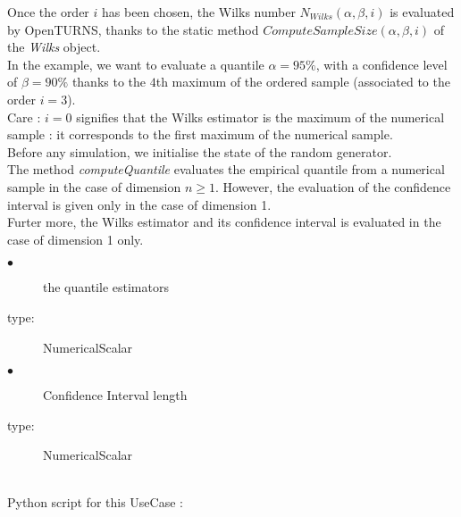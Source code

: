 Once the order $i$ has been chosen, the Wilks number $N_{Wilks}(\alpha, \beta,i)$ is evaluated by OpenTURNS, thanks to the static method $ComputeSampleSize(\alpha, \beta, i)$ of the \textit{Wilks} object.\\

In the example, we want to evaluate a quantile $\alpha = 95\%$, with a confidence level of $\beta = 90\%$ thanks to the $4$th maximum of the ordered sample (associated to the order $i = 3$).\\
Care : $i=0$ signifies that the Wilks estimator is the maximum of the numerical sample : it corresponds to the first maximum of the numerical sample.\\

Before any simulation, we initialise the state of the random generator.\\

The method {\itshape computeQuantile} evaluates the empirical quantile from a numerical sample in the case of dimension $n \geq 1$. However, the evaluation of the confidence interval is given only in the case of dimension 1.\\
Furter more, the Wilks estimator and its confidence interval is evaluated in the case of dimension 1 only.\\

             {
               \begin{description}
               \item[$\bullet$] the quantile estimators
               \item[type:] NumericalScalar
               \item[$\bullet$] Confidence Interval length
               \item[type:] NumericalScalar
               \end{description}
             }

             \textspace\\
             Python script for this UseCase :


